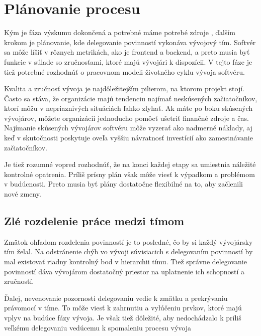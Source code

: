 \documentclass[10pt,twoside,slovak,a4paper]{article}
\begin{document}
\section{Plánovanie procesu}
Kým je fáza výskumu dokončená a potrebné máme potrebé zdroje , ďalším krokom je plánovanie, kde delegovanie povinností vykonáva vývojový tím. Softvér sa môže líšiť v rôznych metrikách, ako je frontend a backend, a preto musia byť funkcie v súlade so zručnosťami, ktoré majú vývojári k dispozícii. V tejto fáze je tiež potrebné rozhodnúť o pracovnom modeli životného cyklu vývoja softvéru.

Kvalita a zručnosť vývoja je najdôležitejším pilierom, na ktorom projekt stojí. Často sa stáva, že organizácie majú tendenciu najímať neskúsených začiatočníkov, ktorí môžu v nepriaznivých situáciách ľahko zlyhať.
Ak máte po boku skúsených vývojárov, môžete organizácii jednoducho pomôcť ušetriť finančné zdroje a čas. Najímanie skúsených vývojárov softvéru môže vyzerať ako nadmerné náklady, aj keď v skutočnosti poskytuje oveľa vyššiu návratnosť investícií ako zamestnávanie začiatočníkov.


Je tiež rozumné vopred rozhodnúť, že na konci každej etapy sa umiestnia náležité kontrolné opatrenia. Príliš prísny plán však môže viesť k výpadkom a problémom v budúcnosti. Preto musia byť plány dostatočne flexibilné na to, aby začlenili nové zmeny.

\subsection{Zlé rozdelenie práce medzi tímom}

Zmätok ohľadom rozdelenia povinností je to posledné, čo by si každý vývojársky tím želal. Na odstránenie chýb vo vývoji súvisiacich s delegovaním povinností by mal existovať riadny kontrolný bod v hierarchii tímu. Tiež správne delegovanie povinností dáva vývojárom dostatočný priestor na uplatnenie ich schopností a zručností.

Ďalej, nevenovanie pozornosti delegovaniu vedie k zmätku a prekrývaniu právomocí v tíme. To môže viesť k zahrnutiu a vylúčeniu prvkov, ktoré majú vplyv na budúce fázy vývoja. Je však tiež dôležité, aby nedochádzalo k príliš veľkému delegovaniu vedúcemu k spomaleniu procesu vývoja
\end{document}
